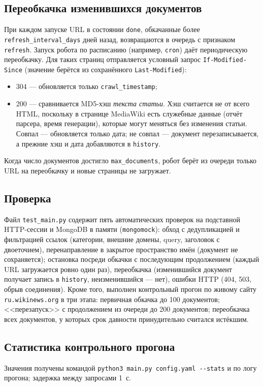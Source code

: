 \subsection{Переобкачка изменившихся документов}
При каждом запуске URL в состоянии \texttt{done}, обкачанные более
\texttt{refresh\_interval\_days} дней назад, возвращаются в очередь с признаком
\texttt{refresh}. Запуск робота по расписанию (например, \texttt{cron}) даёт
периодическую переобкачку. Для таких страниц отправляется условный запрос
\texttt{If-Modified-Since} (значение берётся из сохранённого
\texttt{Last-Modified}):
\begin{itemize}
    \item 304 --- обновляется только \texttt{crawl\_timestamp};
    \item 200 --- сравнивается MD5-хэш \emph{текста статьи}. Хэш считается не
    от всего HTML, поскольку в странице MediaWiki есть служебные данные
    (отчёт парсера, время генерации), которые могут меняться без изменения
    статьи. Совпал --- обновляется только дата; не совпал --- документ
    перезаписывается, а прежние хэш и дата добавляются в \texttt{history}.
\end{itemize}
Когда число документов достигло \texttt{max\_documents}, робот берёт из очереди
только URL на переобкачку и новые страницы не загружает.

\subsection{Проверка}
Файл \texttt{test\_main.py} содержит пять автоматических проверок на
подставной HTTP-сессии и MongoDB в памяти (\texttt{mongomock}): обход с
дедупликацией и фильтрацией ссылок (категории, внешние домены, query, заголовок
с двоеточием), перенаправление в закрытое пространство имён (документ не сохраняется); остановка посреди обкачки с последующим продолжением (каждый URL
загружается ровно один раз), переобкачка (изменившийся документ получает
запись в \texttt{history}, неизменившийся --- нет), ошибки HTTP (404,
503, обрыв соединения). Кроме того, выполнен контрольный прогон по живому сайту
\texttt{ru.wikinews.org} в три этапа: первичная обкачка до 100 документов;
<<перезапуск>> с продолжением из очереди до 200 документов; переобкачка всех
документов, у которых срок давности принудительно считался истёкшим.

\subsection{Статистика контрольного прогона}
Значения получены командой \texttt{python3 main.py config.yaml -{}-stats} и по
логу прогона; задержка между запросами 1~с.

